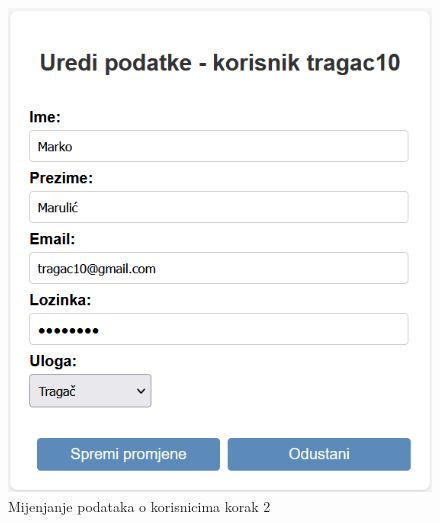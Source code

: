 			\begin{figure}[H]
				\includegraphics[scale=0.6]{slike/test12.png}
				\centering
				\caption{Mijenjanje podataka o korisnicima korak 2}
				\label{fig:Mijenjanje podataka o korisnicima korak 2}
			\end{figure}

